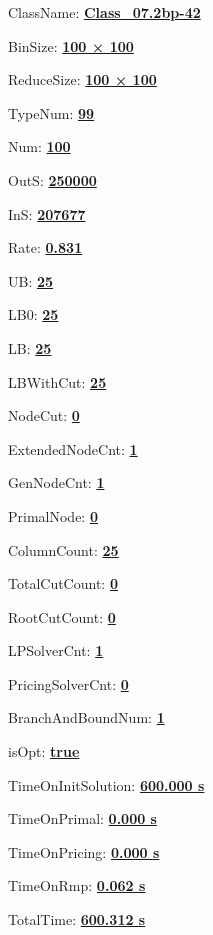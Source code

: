 \documentclass[11pt]{article}
\begin{document}
\pagestyle{empty}


ClassName: \underline{\textbf{Class_07.2bp-42}}
\par
BinSize: \underline{\textbf{100 × 100}}
\par
ReduceSize: \underline{\textbf{100 × 100}}
\par
TypeNum: \underline{\textbf{99}}
\par
Num: \underline{\textbf{100}}
\par
OutS: \underline{\textbf{250000}}
\par
InS: \underline{\textbf{207677}}
\par
Rate: \underline{\textbf{0.831}}
\par
UB: \underline{\textbf{25}}
\par
LB0: \underline{\textbf{25}}
\par
LB: \underline{\textbf{25}}
\par
LBWithCut: \underline{\textbf{25}}
\par
NodeCut: \underline{\textbf{0}}
\par
ExtendedNodeCnt: \underline{\textbf{1}}
\par
GenNodeCnt: \underline{\textbf{1}}
\par
PrimalNode: \underline{\textbf{0}}
\par
ColumnCount: \underline{\textbf{25}}
\par
TotalCutCount: \underline{\textbf{0}}
\par
RootCutCount: \underline{\textbf{0}}
\par
LPSolverCnt: \underline{\textbf{1}}
\par
PricingSolverCnt: \underline{\textbf{0}}
\par
BranchAndBoundNum: \underline{\textbf{1}}
\par
isOpt: \underline{\textbf{true}}
\par
TimeOnInitSolution: \underline{\textbf{600.000 s}}
\par
TimeOnPrimal: \underline{\textbf{0.000 s}}
\par
TimeOnPricing: \underline{\textbf{0.000 s}}
\par
TimeOnRmp: \underline{\textbf{0.062 s}}
\par
TotalTime: \underline{\textbf{600.312 s}}
\par
\newpage


\end{document}
